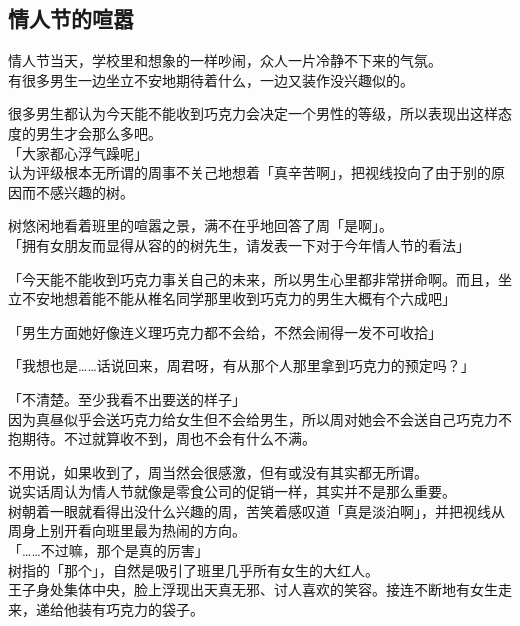 \subsection{情人节的喧嚣}

情人节当天，学校里和想象的一样吵闹，众人一片冷静不下来的气氛。\\

有很多男生一边坐立不安地期待着什么，一边又装作没兴趣似的。

很多男生都认为今天能不能收到巧克力会决定一个男性的等级，所以表现出这样态度的男生才会那么多吧。\\

「大家都心浮气躁呢」\\

认为评级根本无所谓的周事不关己地想着「真辛苦啊」，把视线投向了由于别的原因而不感兴趣的树。

树悠闲地看着班里的喧嚣之景，满不在乎地回答了周「是啊」。\\

「拥有女朋友而显得从容的的树先生，请发表一下对于今年情人节的看法」

「今天能不能收到巧克力事关自己的未来，所以男生心里都非常拼命啊。而且，坐立不安地想着能不能从椎名同学那里收到巧克力的男生大概有个六成吧」

「男生方面她好像连义理巧克力都不会给，不然会闹得一发不可收拾」

「我想也是……话说回来，周君呀，有从那个人那里拿到巧克力的预定吗？」

「不清楚。至少我看不出要送的样子」\\

因为真昼似乎会送巧克力给女生但不会给男生，所以周对她会不会送自己巧克力不抱期待。不过就算收不到，周也不会有什么不满。

不用说，如果收到了，周当然会很感激，但有或没有其实都无所谓。\\

说实话周认为情人节就像是零食公司的促销一样，其实并不是那么重要。\\

树朝着一眼就看得出没什么兴趣的周，苦笑着感叹道「真是淡泊啊」，并把视线从周身上别开看向班里最为热闹的方向。\\

「……不过嘛，那个是真的厉害」\\

树指的「那个」，自然是吸引了班里几乎所有女生的大红人。\\

王子身处集体中央，脸上浮现出天真无邪、讨人喜欢的笑容。接连不断地有女生走来，递给他装有巧克力的袋子。

